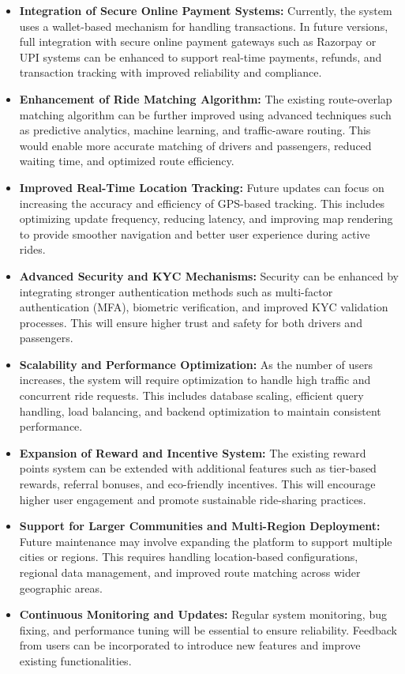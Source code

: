 \documentclass[10pt,a4paper]{report}
\begin{document}
\begin{itemize}

\item \textbf{Integration of Secure Online Payment Systems:}
Currently, the system uses a wallet-based mechanism for handling transactions. In future versions, full integration with secure online payment gateways such as Razorpay or UPI systems can be enhanced to support real-time payments, refunds, and transaction tracking with improved reliability and compliance.

\item \textbf{Enhancement of Ride Matching Algorithm:}
The existing route-overlap matching algorithm can be further improved using advanced techniques such as predictive analytics, machine learning, and traffic-aware routing. This would enable more accurate matching of drivers and passengers, reduced waiting time, and optimized route efficiency.

\item \textbf{Improved Real-Time Location Tracking:}
Future updates can focus on increasing the accuracy and efficiency of GPS-based tracking. This includes optimizing update frequency, reducing latency, and improving map rendering to provide smoother navigation and better user experience during active rides.

\item \textbf{Advanced Security and KYC Mechanisms:}
Security can be enhanced by integrating stronger authentication methods such as multi-factor authentication (MFA), biometric verification, and improved KYC validation processes. This will ensure higher trust and safety for both drivers and passengers.

\item \textbf{Scalability and Performance Optimization:}
As the number of users increases, the system will require optimization to handle high traffic and concurrent ride requests. This includes database scaling, efficient query handling, load balancing, and backend optimization to maintain consistent performance.

\item \textbf{Expansion of Reward and Incentive System:}
The existing reward points system can be extended with additional features such as tier-based rewards, referral bonuses, and eco-friendly incentives. This will encourage higher user engagement and promote sustainable ride-sharing practices.

\item \textbf{Support for Larger Communities and Multi-Region Deployment:}
Future maintenance may involve expanding the platform to support multiple cities or regions. This requires handling location-based configurations, regional data management, and improved route matching across wider geographic areas.

\item \textbf{Continuous Monitoring and Updates:}
Regular system monitoring, bug fixing, and performance tuning will be essential to ensure reliability. Feedback from users can be incorporated to introduce new features and improve existing functionalities.

\end{itemize}
\end{document}
